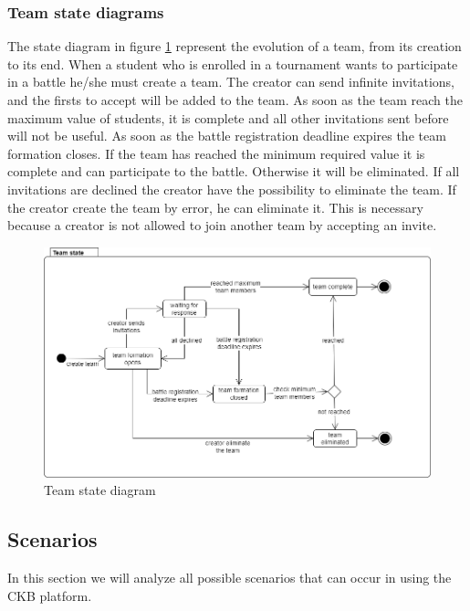 \subsubsection*{Team state diagrams}
The state diagram in figure \ref{fig:team_state} represent the evolution of a team, from its creation to its end. \newline
When a student who is enrolled in a tournament wants to participate in a battle he/she must create a team. The creator can send infinite invitations, and the firsts to accept will be added to the team. As soon as the team reach the maximum value of students, it is complete and all other invitations sent before will not be useful. \newline
As soon as the battle registration deadline expires the team formation closes. If the team has reached the minimum required value it is complete and can participate to the battle. Otherwise it will be eliminated. \newline 
If all invitations are declined the creator have the possibility to eliminate the team. 
If the creator create the team by error, he can eliminate it. This is necessary because a creator is not allowed to join another team by accepting an invite.

\begin{figure}[H]
    \centering
    \includegraphics[scale=0.5]{images/team_state.png}
    \caption{Team state diagram}
    \label{fig:team_state}
\end{figure}
\clearpage

\subsection{Scenarios}\label{desc:scenarios}
In this section we will analyze all possible scenarios that can occur in using the CKB platform.

